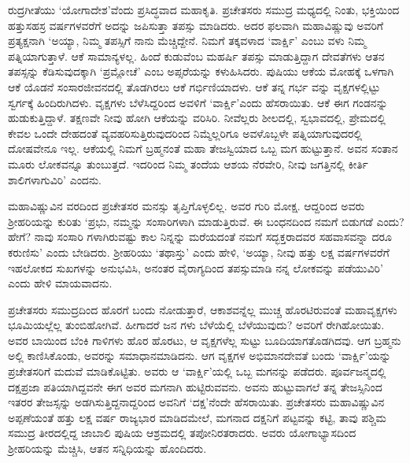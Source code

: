 ರುದ್ರಗೀತೆಯು ‘ಯೋಗಾದೇಶ’ವೆಂದು ಪ್ರಸಿದ್ಧವಾದ ಮಹಾಕೃತಿ. ಪ್ರಚೇತಸರು ಸಮುದ್ರ ಮಧ್ಯದಲ್ಲಿ ನಿಂತು, ಭಕ್ತಿಯಿಂದ ಹತ್ತುಸಹಸ್ರ ವರ್ಷಗಳವರೆಗೆ ಅದನ್ನು ಜಪಿಸುತ್ತಾ ತಪಸ್ಸು ಮಾಡಿದರು. ಅದರ ಫಲವಾಗಿ ಮಹಾವಿಷ್ಣುವು ಅವರಿಗೆ ಪ್ರತ್ಯಕ್ಷನಾಗಿ ‘ಅಯ್ಯಾ, ನಿಮ್ಮ ತಪಸ್ಸಿಗೆ ನಾನು ಮೆಚ್ಚಿದ್ದೇನೆ. ನಿಮಗೆ ತಕ್ಕವಳಾದ ‘ವಾರ್ಕ್ಷಿ’ ಎಂಬು ವಳು ನಿಮ್ಮ ಪತ್ನಿಯಾಗುತ್ತಾಳೆ. ಆಕೆ ಸಾಮಾನ್ಯಳಲ್ಲ. ಹಿಂದೆ ಕುಡುವೆಂಬ ಮಹರ್ಷಿ ತಪಸ್ಸು ಮಾಡುತ್ತಿದ್ದಾಗ ದೇವತೆಗಳು ಆತನ ತಪಸ್ಸನ್ನು ಕೆಡಿಸುವುದಕ್ಕಾಗಿ ‘ಪ್ರಮ್ಲೋಚೆ’ ಎಂಬ ಅಪ್ಸರೆಯನ್ನು ಕಳುಹಿಸಿದರು. ಪುಷಿಯು ಆಕೆಯ ಮೋಹಕ್ಕೆ ಒಳಗಾಗಿ ಆಕೆ ಯೊಡನೆ ಸಂಸಾರಜೀವನದಲ್ಲಿ ತೊಡಗಿರಲು ಆಕೆ ಗರ್ಭಿಣಿಯಾದಳು. ಆಕೆ ತನ್ನ ಗರ್ಭ ವನ್ನು ವೃಕ್ಷಗಳಲ್ಲಿಟ್ಟು ಸ್ವರ್ಗಕ್ಕೆ ಹಿಂದಿರುಗಿದಳು. ವೃಕ್ಷಗಳು ಬೆಳೆಸಿದ್ದರಿಂದ ಅವಳಿಗೆ ‘ವಾರ್ಕ್ಷಿ’ಎಂದು ಹೆಸರಾಯಿತು. ಆಕೆ ಈಗ ಗಂಡನನ್ನು ಹುಡುಕುತ್ತಿದ್ದಾಳೆ. ತಕ್ಷಣವೇ ನೀವು ಹೋಗಿ ಆಕೆಯನ್ನು ವರಿಸಿರಿ. ನೀವೆಲ್ಲರು ಶೀಲದಲ್ಲಿ, ಸ್ವಭಾವದಲ್ಲಿ, ಪ್ರೇಮದಲ್ಲಿ ಕೇವಲ ಒಂದೇ ದೇಹದಂತೆ ವ್ಯವಹರಿಸುತ್ತಿರುವುದರಿಂದ ನಿಮ್ಮೆಲ್ಲರಿಗೂ ಅವಳೊಬ್ಬಳೇ ಪತ್ನಿಯಾಗುವುದರಲ್ಲಿ ದೋಷವೇನೂ ಇಲ್ಲ. ಆಕೆಯಲ್ಲಿ ನಿಮಗೆ ಬ್ರಹ್ಮನಂತೆ ಮಹಾ ತೇಜಸ್ವಿಯಾದ ಒಬ್ಬ ಮಗ ಹುಟ್ಟುತ್ತಾನೆ. ಅವನ ಸಂತಾನ ಮೂರು ಲೋಕವನ್ನೂ ತುಂಬುತ್ತದೆ. ಇದರಿಂದ ನಿಮ್ಮ ತಂದೆಯ ಆಶಯ ನೆರವೇರಿ, ನೀವು ಜಗತ್ತಿನಲ್ಲಿ ಕೀರ್ತಿ ಶಾಲಿಗಳಾಗುವಿರಿ’ ಎಂದನು.

ಮಹಾವಿಷ್ಣುವಿನ ವರದಿಂದ ಪ್ರಚೇತಸರ ಮನಸ್ಸು ತೃಪ್ತಿಗೊಳ್ಳಲಿಲ್ಲ. ಅವರ ಗುರಿ ಮೋಕ್ಷ. ಆದ್ದರಿಂದ ಅವರು ಶ್ರೀಹರಿಯನ್ನು ಕುರಿತು ‘ಪ್ರಭು, ನಮ್ಮನ್ನು ಸಂಸಾರಿಗಳಾಗಿ ಮಾಡುತ್ತಿರುವೆ. ಈ ಬಂಧನದಿಂದ ನಮಗೆ ಬಿಡುಗಡೆ ಎಂದು? ಹೇಗೆ? ನಾವು ಸಂಸಾರಿ ಗಳಾಗಿರುವಷ್ಟು ಕಾಲ ನಿನ್ನನ್ನು ಮರೆಯದಂತೆ ನಮಗೆ ಸದ್ಭಕ್ತರಾದವರ ಸಹವಾಸವನ್ನಾ ದರೂ ಕರುಣಿಸು’ ಎಂದು ಬೇಡಿದರು. ಶ್ರೀಹರಿಯು ‘ತಥಾಸ್ತು’ ಎಂದು ಹೇಳಿ, ‘ಅಯ್ಯಾ, ನೀವು ಹತ್ತು ಲಕ್ಷ ವರ್ಷಗಳವರೆಗೆ ಇಹಲೋಕದ ಸುಖಗಳನ್ನು ಅನುಭವಿಸಿ, ಅನಂತರ ವೈರಾಗ್ಯದಿಂದ ತಪಸ್ಸುಮಾಡಿ ನನ್ನ ಲೋಕವನ್ನು ಪಡೆಯುವಿರಿ’ ಎಂದು ಹೇಳಿ ಮಾಯವಾದನು.

ಪ್ರಚೇತಸರು ಸಮುದ್ರದಿಂದ ಹೊರಗೆ ಬಂದು ನೋಡುತ್ತಾರೆ, ಆಕಾಶವನ್ನೆಲ್ಲ ಮುಚ್ಚ ಹೊರಟಿರುವಂತೆ ಮಹಾವೃಕ್ಷಗಳು ಭೂಮಿಯಲ್ಲೆಲ್ಲ ತುಂಬಿಹೋಗಿವೆ. ಹೀಗಾದರೆ ಜನ ಗಳು ಬೆಳೆಯೆಲ್ಲಿ ಬೆಳೆಯುವುದು? ಅವರಿಗೆ ರೇಗಿಹೋಯಿತು. ಅವರ ಬಾಯಿಂದ ಬೆಂಕಿ ಗಾಳಿಗಳು ಹೊರ ಹೊರಟು, ಆ ವೃಕ್ಷಗಳೆಲ್ಲ ಸುಟ್ಟು ಬೂದಿಯಾಗತೊಡಗಿದವು. ಆಗ ಬ್ರಹ್ಮನು ಅಲ್ಲಿ ಕಾಣಿಸಿಕೊಂಡು, ಅವರನ್ನು ಸಮಾಧಾನಮಾಡಿದನು. ಆಗ ವೃಕ್ಷಗಳ ಅಭಿಮಾನದೇವತೆ ಬಂದು ‘ವಾರ್ಕ್ಷಿ’ಯನ್ನು ಪ್ರಚೇತಸರಿಗೆ ಮದುವೆ ಮಾಡಿಕೊಟ್ಟಿತು. ಅವರು ಆ ‘ವಾರ್ಕ್ಷಿ’ಯಲ್ಲಿ ಒಬ್ಬ ಮಗನನ್ನು ಪಡೆದರು. ಪೂರ್ವಜನ್ಮದಲ್ಲಿ ದಕ್ಷಪ್ರಜಾ ಪತಿಯಾಗಿದ್ದವನೇ ಈಗ ಅವರ ಮಗನಾಗಿ ಹುಟ್ಟಿರುವವನು. ಅವನು ಹುಟ್ಟುವಾಗಲೆ ತನ್ನ ತೇಜಸ್ಸಿನಿಂದ ಇತರರ ತೇಜಸ್ಸನ್ನು ಅಡಗಿಸುತ್ತಿದ್ದನಾದ್ದರಿಂದ ಅವನಿಗೆ ‘ದಕ್ಷ’ನೆಂದೇ ಹೆಸರಾಯಿತು. ಪ್ರಚೇತಸರು ಮಹಾವಿಷ್ಣುವಿನ ಅಪ್ಪಣೆಯಂತೆ ಹತ್ತು ಲಕ್ಷ ವರ್ಷ ರಾಜ್ಯಭಾರ ಮಾಡಿದಮೇಲೆ, ಮಗನಾದ ದಕ್ಷನಿಗೆ ಪಟ್ಟವನ್ನು ಕಟ್ಟಿ, ತಾವು ಪಶ್ಚಿಮ ಸಮುದ್ರ ತೀರದಲ್ಲಿದ್ದ ಜಾಬಾಲಿ ಪುಷಿಯ ಆಶ್ರಮದಲ್ಲಿ ತಪೋನಿರತರಾದರು. ಅವರು ಯೋಗಾಭ್ಯಾಸದಿಂದ ಶ್ರೀಹರಿಯನ್ನು ಮೆಚ್ಚಿಸಿ, ಆತನ ಸನ್ನಿಧಿಯನ್ನು ಹೊಂದಿದರು.

